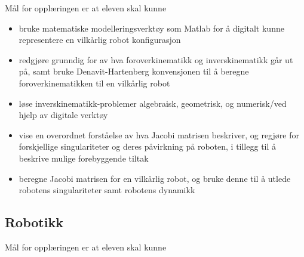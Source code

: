     Mål for opplæringen er at eleven skal kunne

    \begin{itemize}
        \item bruke matematiske modelleringsverktøy som Matlab for å digitalt kunne representere en vilkårlig robot konfigurasjon
        \item redgjøre grunndig for av hva foroverkinematikk og inverskinematikk går ut på, samt bruke Denavit-Hartenberg konvensjonen til å beregne foroverkinematikken til en vilkårlig robot
        \item løse inverskinematikk-problemer algebraisk, geometrisk, og numerisk/ved hjelp av digitale verktøy
        \item vise en overordnet forståelse av hva Jacobi matrisen beskriver, og regjøre for forskjellige singulariteter og deres påvirkning på roboten, i tillegg til å beskrive mulige forebyggende tiltak
        \item beregne Jacobi matrisen for en vilkårlig robot, og bruke denne til å utlede robotens singulariteter samt robotens dynamikk
    \end{itemize}


\subsection*{Robotikk}

    Mål for opplæringen er at eleven skal kunne

